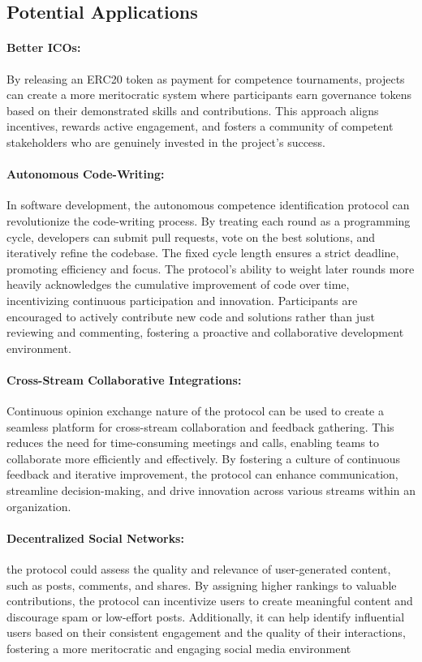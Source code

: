 \documentclass{article}
\begin{document}
\begin{CJK}{UTF8}{gbsn}
\begin{multicols}{2}
        \section{Potential Applications}
        \paragraph*{Better ICOs:} By releasing an ERC20 token as payment for competence tournaments, projects can create a more meritocratic system where participants earn governance tokens based on their demonstrated skills and contributions. This approach aligns incentives, rewards active engagement, and fosters a community of competent stakeholders who are genuinely invested in the project's success.

        \paragraph*{Autonomous Code-Writing:} In software development, the autonomous competence identification protocol can revolutionize the code-writing process. By treating each round as a programming cycle, developers can submit pull requests, vote on the best solutions, and iteratively refine the codebase. The fixed cycle length ensures a strict deadline, promoting efficiency and focus. The protocol's ability to weight later rounds more heavily acknowledges the cumulative improvement of code over time, incentivizing continuous participation and innovation. Participants are encouraged to actively contribute new code and solutions rather than just reviewing and commenting, fostering a proactive and collaborative development environment.

        \paragraph*{Cross-Stream Collaborative Integrations:} Continuous opinion exchange nature of the protocol can be used to create a seamless platform for cross-stream collaboration and feedback gathering. This reduces the need for time-consuming meetings and calls, enabling teams to collaborate more efficiently and effectively. By fostering a culture of continuous feedback and iterative improvement, the protocol can enhance communication, streamline decision-making, and drive innovation across various streams within an organization.

        \paragraph*{Decentralized Social Networks:} the protocol could assess the quality and relevance of user-generated content, such as posts, comments, and shares. By assigning higher rankings to valuable contributions, the protocol can incentivize users to create meaningful content and discourage spam or low-effort posts. Additionally, it can help identify influential users based on their consistent engagement and the quality of their interactions, fostering a more meritocratic and engaging social media environment


\end{multicols}
\end{CJK}
\end{document}
